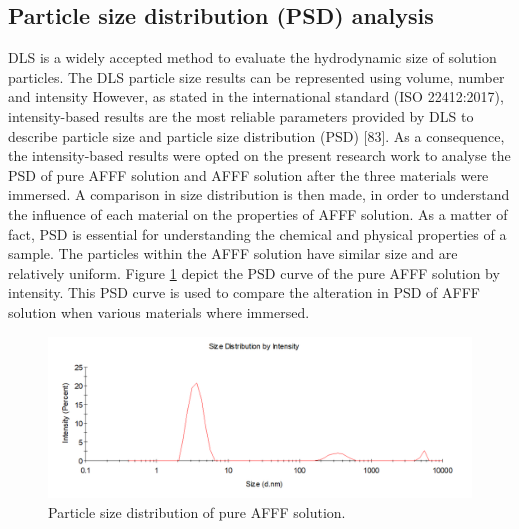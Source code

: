 \documentclass[12pt]{report}
\begin{document}
\subsection{Particle size distribution (PSD) analysis} 
DLS is a widely accepted method to evaluate the hydrodynamic size of solution particles. The DLS particle size results can be represented using volume, number and intensity However, as stated in the international standard (ISO 22412:2017), intensity-based results are the most reliable parameters provided by DLS to describe particle size and particle size distribution (PSD) [83]. As a consequence, the intensity-based results were opted on the present research work to analyse the PSD of pure AFFF solution and AFFF solution after the three materials were immersed. A comparison in size distribution is then made, in order to understand the influence of each material on the properties of AFFF solution. As a matter of fact, PSD is essential for understanding the chemical and physical properties of a sample. The particles within the AFFF solution have similar size and are relatively uniform. Figure \ref{ch5:figure:pure_afff} depict the PSD curve of the pure AFFF solution by intensity. This PSD curve is used to compare the alteration in PSD of AFFF solution when various materials where immersed. 

\begin{figure}[H]
    \centering
    \includegraphics[width=.8\textwidth]{particle_size_distribution_of_pure_afff_solution.png}
    \caption{Particle size distribution of pure AFFF solution.}
    \label{ch5:figure:pure_afff}
\end{figure}
\end{document}
